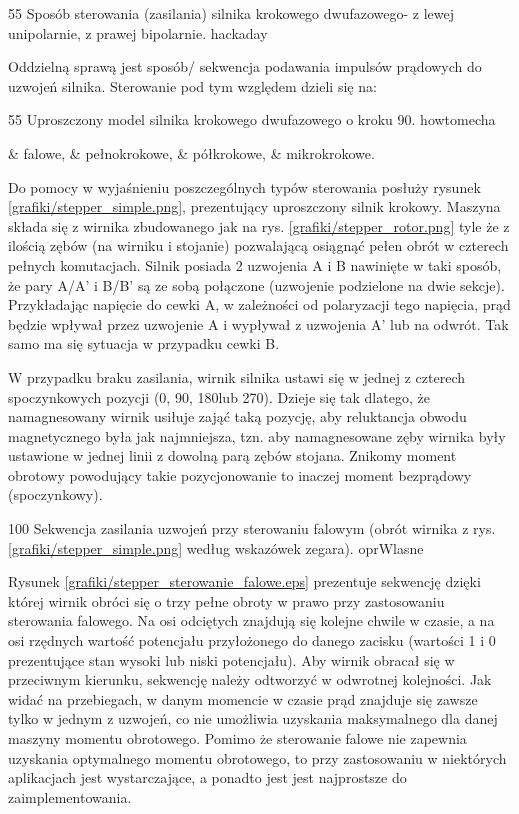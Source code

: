 		{55}
		{Sposób sterowania (zasilania) silnika krokowego dwufazowego- z lewej unipolarnie, z prawej bipolarnie.}
		{hackaday}
		
Oddzielną sprawą jest sposób/ sekwencja podawania impulsów prądowych do uzwojeń silnika. Sterowanie pod tym względem dzieli się na:

		{55}
		{Uproszczony model silnika krokowego dwufazowego o kroku 90\degree.}
		{howtomecha}

\begin{easylist}
	& falowe, 
	& pełnokrokowe, 
	& półkrokowe,
	& mikrokrokowe.
	\\
\end{easylist}

Do pomocy w wyjaśnieniu poszczególnych typów sterowania posłuży rysunek \ref{grafiki/stepper_simple.png}, prezentujący uproszczony silnik krokowy. Maszyna składa się z wirnika zbudowanego jak na rys. \ref{grafiki/stepper_rotor.png} tyle że z ilością zębów (na wirniku i stojanie) pozwalającą osiągnąć pełen obrót w czterech pełnych komutacjach. Silnik posiada 2 uzwojenia A i B nawinięte w taki sposób, że pary A/A' i B/B' są ze sobą połączone (uzwojenie podzielone na dwie sekcje). Przykładając napięcie do cewki A, w zależności od polaryzacji tego napięcia, prąd będzie wpływał przez uzwojenie A i wypływał z uzwojenia A' lub na odwrót. Tak samo ma się sytuacja w przypadku cewki B.


W przypadku braku zasilania, wirnik silnika ustawi się w jednej z czterech spoczynkowych pozycji (0\degree, 90\degree, 180\degree lub 270\degree). Dzieje się tak dlatego, że namagnesowany wirnik usiłuje zająć taką pozycję, aby reluktancja obwodu magnetycznego była jak najmniejsza, tzn. aby namagnesowane zęby wirnika były ustawione w jednej linii z dowolną parą zębów stojana. Znikomy moment obrotowy powodujący takie pozycjonowanie to inaczej moment bezprądowy (spoczynkowy). 

		{100}
		{Sekwencja zasilania uzwojeń przy sterowaniu falowym (obrót wirnika z rys. \ref{grafiki/stepper_simple.png} według wskazówek zegara).}
		{oprWlasne}

Rysunek \ref{grafiki/stepper_sterowanie_falowe.eps} prezentuje sekwencję dzięki której wirnik obróci się o trzy pełne obroty w prawo przy zastosowaniu sterowania falowego. Na osi odciętych znajdują się kolejne chwile w czasie, a na osi rzędnych wartość potencjału przyłożonego do danego zacisku (wartości 1 i 0 prezentujące stan wysoki lub niski potencjału). Aby wirnik obracał się w przeciwnym kierunku, sekwencję należy odtworzyć w odwrotnej kolejności. Jak widać na przebiegach, w danym momencie w czasie prąd znajduje się zawsze tylko w jednym z uzwojeń, co nie umożliwia uzyskania maksymalnego dla danej maszyny momentu obrotowego. Pomimo że sterowanie falowe nie zapewnia uzyskania optymalnego momentu obrotowego, to przy zastosowaniu w niektórych aplikacjach jest wystarczające, a ponadto jest jest najprostsze do zaimplementowania.

